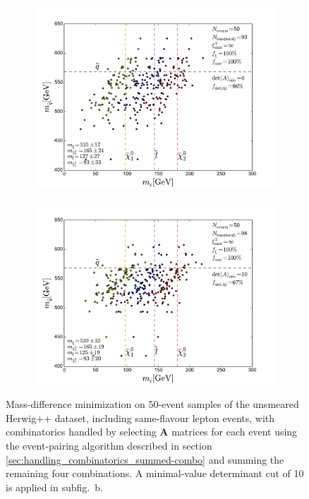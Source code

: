 \documentclass[twoside,english]{uiofysmaster}
\begin{document}
\begin{figure}[hbt]
	\centering
	\begin{subfigure}[b]{0.45\textwidth}
		\includegraphics[width=\textwidth]{figures/improving_combinatorics/herwigpp-OSFL-50events_nosmear_nodetAcut_A_matrix_algorithm_4combosum_TMP.pdf} 
		\caption{ }
		\label{fig:event-pair-A-selection_4combosum-OSFL-50events_a}
	\end{subfigure}
	\begin{subfigure}[b]{0.45\textwidth}
		\includegraphics[width=\textwidth]{figures/improving_combinatorics/herwigpp-OSFL-50events_nosmear_detAcut10_A_matrix_algorithm_4combosum_TMP.pdf}
		\caption{ }
		\label{fig:event-pair-A-selection_4combosum-OSFL-50events_b} 
	\end{subfigure}
	\caption{Mass-difference minimization on 50-event samples of the unsmeared Herwig++ dataset, including same-flavour lepton events, with combinatorics handled by selecting $\mathbf{A}$ matrices for each event using the event-pairing algorithm described in section \ref{sec:handling_combinatorics_summed-combo} and summing the remaining four combinations. A minimal-value determinant cut of 10 is applied in subfig.\ b.}
	\label{fig:event-pair-A-selection_4combosum-OSFL-50events}
\end{figure}
\end{document}
